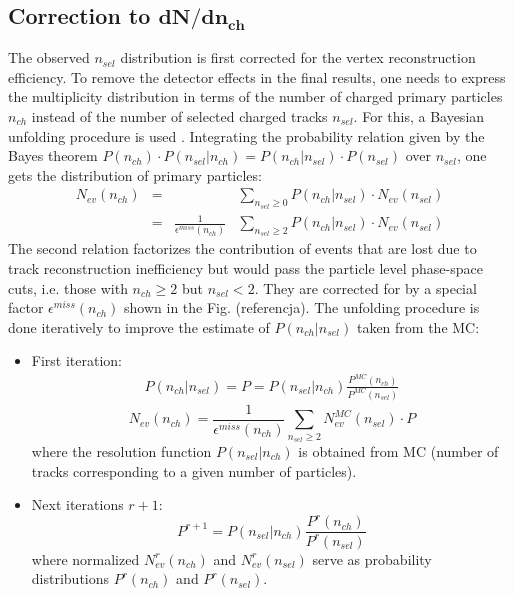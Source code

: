 \subsection[Correction to $dN/dn_{ch}$]{Correction to $\mathbf{dN/dn_{ch}}$}\label{section:star_dNdnch}

The observed $n_{sel}$ distribution is first corrected for the vertex reconstruction efficiency.  To remove the detector effects in the final results, one needs to express the multiplicity distribution in terms
of the number of charged primary particles $n_{ch}$ instead of the number of selected charged tracks $n_{sel}$. For
this, a Bayesian unfolding procedure is used \cite{DAGOSTINI1995487}. Integrating the probability relation given by the Bayes
theorem $P(n_{ch})\cdot P(n_{sel}|n_{ch}) = P(n_{ch}|n_{sel})\cdot P(n_{sel})$ over $n_{sel}$, one gets the distribution of primary particles:
\begin{equation}
\begin{array}{ccccc}
N_{ev}(n_{ch})&=&&\sum_{n_{sel}\geq0}P(n_{ch}|n_{sel})\cdot N_{ev}(n_{sel})\\
&=&\frac{1}{\epsilon^{miss}(n_{ch})}&\sum_{n_{sel}\geq2}P(n_{ch}|n_{sel})\cdot N_{ev}(n_{sel})
\end{array}
\end{equation}
The second relation factorizes the contribution of events that are lost due to track reconstruction inefficiency
but would pass the particle level phase-space cuts, i.e. those with $n_{ch}\geq2$ but $n_{sel}<2$. They are corrected
for by a special factor $\epsilon^{miss}(n_{ch})$ shown in the Fig. (referencja). The unfolding procedure is done iteratively to improve the estimate of $P(n_{ch}|n_{sel})$ taken from the MC:
\begin{itemize}
	\item First iteration: \\
	\begin{eqnarray}
	P(n_{ch}|n_{sel}) = P = P(n_{sel}|n_{ch})\frac{P^{MC}(n_{ch})}{P^{MC}(n_{sel})}
	\end{eqnarray}
	\begin{equation}
	N_{ev}(n_{ch})=\frac{1}{\epsilon^{miss}(n_{ch})}\sum_{n_{sel}\geq2}N_{ev}^{MC}(n_{sel})\cdot P
	\end{equation}
	where the resolution function $P(n_{sel}|n_{ch})$ is obtained from MC (number of tracks corresponding to a given number of particles).
	
	\item Next iterations $r+1$:
	\begin{equation}
	P^{r+1}=P(n_{sel}|n_{ch})\frac{P^{r}(n_{ch})}{P^{r}(n_{sel})}
	\end{equation}
	where normalized $N_{ev}^r(n_{ch})$ and $N_{ev}^r(n_{sel})$ serve as probability distributions $P^{r}(n_{ch})$ and $P^{r}(n_{sel})$.
\end{itemize}

